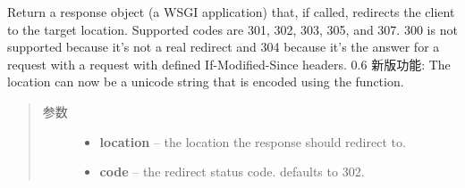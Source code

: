 \documentclass[a4paper,12pt]{sphinxmanual}
\begin{document}
\begin{fulllineitems}
\label{api:flask.redirect}
Return a response object (a WSGI application) that, if called,
redirects the client to the target location.  Supported codes are 301,
302, 303, 305, and 307.  300 is not supported because it's not a real
redirect and 304 because it's the answer for a request with a request
with defined If-Modified-Since headers.
0.6 新版功能: The location can now be a unicode string that is encoded using
the  function.\begin{quote}\begin{description}
\item[{参数}] \leavevmode\begin{itemize}
\item {} 
\textbf{location} -- the location the response should redirect to.

\item {} 
\textbf{code} -- the redirect status code. defaults to 302.

\end{itemize}

\end{description}\end{quote}

\end{fulllineitems}

\end{document}
